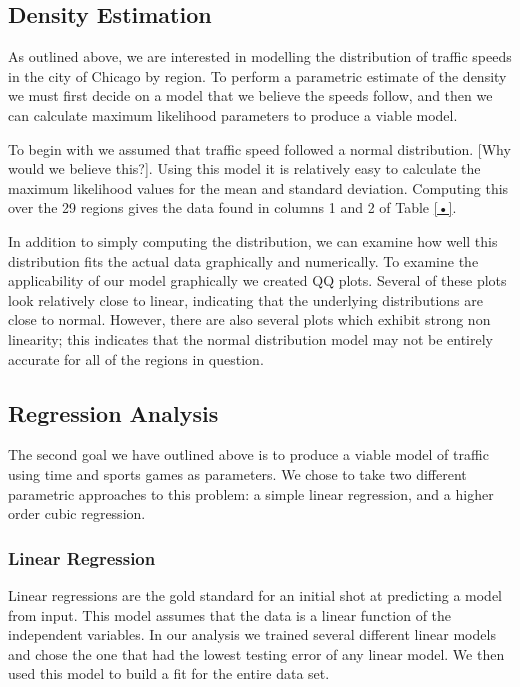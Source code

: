 \documentclass[12pt]{article}
\begin{document}
\subsection{Density Estimation}
As outlined above, we are interested in modelling the distribution of traffic speeds in the city of Chicago by region. To perform a parametric estimate of the density we must first decide on a model that we believe the speeds follow, and then we can calculate maximum likelihood parameters to produce a viable model.

To begin with we assumed that traffic speed followed a normal distribution. [Why would we believe this?]. Using this model it is relatively easy to calculate the maximum likelihood values for the mean and standard deviation. Computing this over the 29 regions gives the data found in columns 1 and 2 of Table \ref{•}.

In addition to simply computing the distribution, we can examine how well this distribution fits the actual data graphically and numerically. To examine the applicability of our model graphically we created QQ plots. Several of these plots look relatively close to linear, indicating that the underlying distributions are close to normal. However, there are also several plots which exhibit strong non linearity; this indicates that the normal distribution model may not be entirely accurate for all of the regions in question.


\subsection{Regression Analysis}
The second goal we have outlined above is to produce a viable model of traffic using time and sports games as parameters. We chose to take two different parametric approaches to this problem: a simple linear regression, and a higher order cubic regression.
\subsubsection{Linear Regression}
Linear regressions are the gold standard for an initial shot at predicting a model from input. This model assumes that the data is a linear function of the independent variables.  In our analysis we trained several different linear models and chose the one that had the lowest testing error of any linear model. We then used this model to build a fit for the entire data set.
\end{document}
